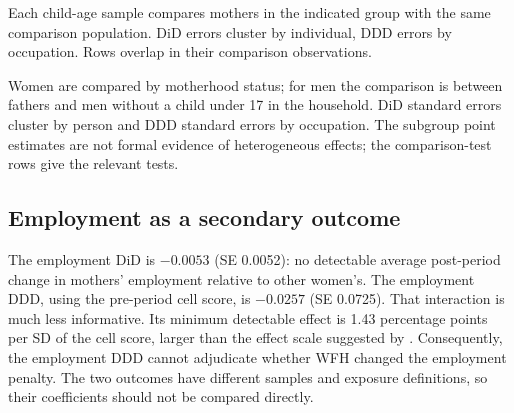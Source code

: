 \documentclass[12pt,a4paper]{article}
\begin{document}
\begin{table}[htbp]\centering\begin{threeparttable}
\caption{Hours estimates by age of the youngest child}\label{tab:childage}
\renewcommand{\baselinestretch}{1}\footnotesize\setlength{\tabcolsep}{3pt}

\begin{tablenotes}\footnotesize\item Each child-age sample compares mothers in the indicated group with the same comparison population. DiD errors cluster by individual, DDD errors by occupation. Rows overlap in their comparison observations. \autonoteChildAge\end{tablenotes}
\end{threeparttable}\end{table}

\begin{table}[htbp]\centering\begin{threeparttable}
\caption{Hours estimates by population group and for fathers}\label{tab:subgroup}
\renewcommand{\baselinestretch}{1}\footnotesize\setlength{\tabcolsep}{3pt}

\begin{tablenotes}\footnotesize\item Women are compared by motherhood status; for men the comparison is between fathers and men without a child under 17 in the household. DiD standard errors cluster by person and DDD standard errors by occupation. The subgroup point estimates are not formal evidence of heterogeneous effects; the comparison-test rows give the relevant tests. \autonoteSubgroup\end{tablenotes}
\end{threeparttable}\end{table}

\subsection{Employment as a secondary outcome}\label{sec:employment}
The employment DiD is $-0.0053$ (SE 0.0052): no detectable average post-period change in mothers' employment relative to other women's. The employment DDD, using the pre-period cell score, is $-0.0257$ (SE 0.0725). That interaction is much less informative. Its minimum detectable effect is 1.43 percentage points per SD of the cell score, larger than the effect scale suggested by \citet{harrington2025}. Consequently, the employment DDD cannot adjudicate whether WFH changed the employment penalty. The two outcomes have different samples and exposure definitions, so their coefficients should not be compared directly.
\end{document}
